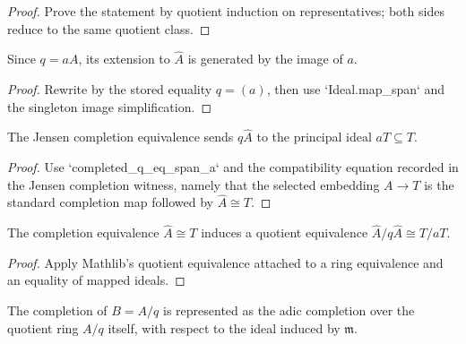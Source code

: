 \begin{proof}
  Prove the statement by quotient induction on representatives; both sides
  reduce to the same quotient class.
\end{proof}

\begin{lemma}
  \label{lem:completed_q_eq_span_a}
  Since \(q=aA\), its extension to \(\widehat A\) is generated by the image of
  \(a\).
\end{lemma}

\begin{proof}
  Rewrite by the stored equality \(q=(a)\), then use `Ideal.map_span` and the
  singleton image simplification.
\end{proof}

\begin{lemma}
  \label{lem:completion_equiv_maps_completed_q}
  The Jensen completion equivalence sends \(q\widehat A\) to the principal
  ideal \(aT\subseteq T\).
\end{lemma}

\begin{proof}
  Use `completed_q_eq_span_a` and the compatibility equation recorded in the
  Jensen completion witness, namely that the selected embedding \(A\to T\) is
  the standard completion map followed by \(\widehat A\cong T\).
\end{proof}

\begin{definition}
  \label{def:completed_quotient_target_equiv_node}
  The completion equivalence \(\widehat A\cong T\) induces a quotient
  equivalence \(\widehat A/q\widehat A\cong T/aT\).
\end{definition}

\begin{proof}
  Apply Mathlib's quotient equivalence attached to a ring equivalence and an
  equality of mapped ideals.
\end{proof}

\begin{definition}
  \label{def:quotient_adic_completion}
  The completion of \(B=A/q\) is represented as the adic completion over the
  quotient ring \(A/q\) itself, with respect to the ideal induced by
  \(\mathfrak m\).
\end{definition}

